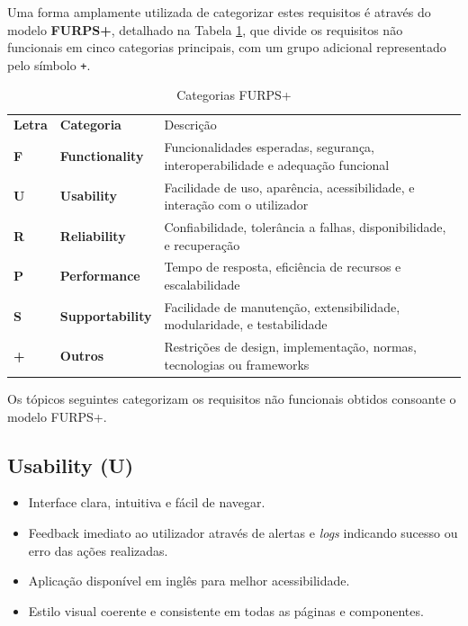 Uma forma amplamente utilizada de categorizar estes requisitos é através do modelo \textbf{FURPS+}, detalhado na Tabela \ref{tab:furps}, que divide os requisitos não funcionais em cinco categorias principais, com um grupo adicional representado pelo símbolo \texttt{+}.

\begin{table}[H]
    \renewcommand{\arraystretch}{1.2}
    \setlength{\tabcolsep}{10pt}
    \centering
    \begin{tabular}{>{\bfseries}p{1cm} >{\bfseries}p{2.5cm} p{10cm}}
        \rowcolor{blue!50}
        Letra & Categoria & Descrição \\
        F & Functionality & Funcionalidades esperadas, segurança, interoperabilidade e adequação funcional \\
        U & Usability & Facilidade de uso, aparência, acessibilidade, e interação com o utilizador \\
        R & Reliability & Confiabilidade, tolerância a falhas, disponibilidade, e recuperação \\
        P & Performance & Tempo de resposta, eficiência de recursos e escalabilidade \\
        S & Supportability & Facilidade de manutenção, extensibilidade, modularidade, e testabilidade \\
        + & Outros & Restrições de design, implementação, normas, tecnologias ou frameworks \\
    \end{tabular}
    \caption{Categorias FURPS+}
    \label{tab:furps}
\end{table}

Os tópicos seguintes categorizam os requisitos não funcionais obtidos consoante o modelo FURPS+.

\subsection{Usability (U)}
\begin{itemize}
    \item Interface clara, intuitiva e fácil de navegar.
    \item Feedback imediato ao utilizador através de alertas e \textit{logs} indicando sucesso ou erro das ações realizadas.
    \item Aplicação disponível em inglês para melhor acessibilidade.
    \item Estilo visual coerente e consistente em todas as páginas e componentes.
\end{itemize}

